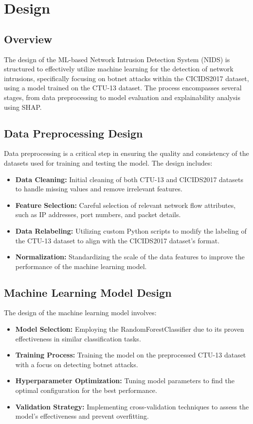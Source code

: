 \chapter{Design}

\section{Overview}
The design of the ML-based Network Intrusion Detection System (NIDS) is structured to effectively utilize machine learning for the detection of network intrusions, specifically focusing on botnet attacks within the CICIDS2017 dataset, using a model trained on the CTU-13 dataset. The process encompasses several stages, from data preprocessing to model evaluation and explainability analysis using SHAP.

\section{Data Preprocessing Design}
Data preprocessing is a critical step in ensuring the quality and consistency of the datasets used for training and testing the model. The design includes:

\begin{itemize}
    \item \textbf{Data Cleaning:} Initial cleaning of both CTU-13 and CICIDS2017 datasets to handle missing values and remove irrelevant features.
    \item \textbf{Feature Selection:} Careful selection of relevant network flow attributes, such as IP addresses, port numbers, and packet details.
    \item \textbf{Data Relabeling:} Utilizing custom Python scripts to modify the labeling of the CTU-13 dataset to align with the CICIDS2017 dataset's format.
    \item \textbf{Normalization:} Standardizing the scale of the data features to improve the performance of the machine learning model.
\end{itemize}

\section{Machine Learning Model Design}
The design of the machine learning model involves:

\begin{itemize}
    \item \textbf{Model Selection:} Employing the RandomForestClassifier due to its proven effectiveness in similar classification tasks.
    \item \textbf{Training Process:} Training the model on the preprocessed CTU-13 dataset with a focus on detecting botnet attacks.
    \item \textbf{Hyperparameter Optimization:} Tuning model parameters to find the optimal configuration for the best performance.
    \item \textbf{Validation Strategy:} Implementing cross-validation techniques to assess the model's effectiveness and prevent overfitting.
\end{itemize}

